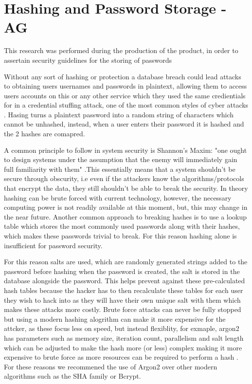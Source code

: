 \documentclass[11pt]{report}
\begin{document}
\section{Hashing and Password Storage - AG}

This research was performed during the production of the product, in order to assertain security guidelines for the storing of passwords \newline

Without any sort of hashing or protection a database breach could lead attacks to obtaining users usernames and passwords in plaintext, allowing them to access users accounts on this or any other service which they used the same credientials for in a credential stuffing attack, one of the most common styles of cyber attacks \cite{OWASP2020}. Hasing turns a plaintext password into a random string of characters which cannot be unhashed, instead, when a user enters their password it is hashed and the 2 hashes are comapred.

A common principle to follow in system security is Shannon's Maxim: "one ought to design systems under the assumption that the enemy will immediately gain full familiarity with them" \cite{Shannon1949}.This essentially means that a system shouldn’t be secure through obscurity, i.e even if the attackers know the algorithms/protocols that encrypt the data, they still shouldn’t be able to break the security. In theory hashing can be brute forced with current technology, however, the necessary computing power is not readily available at this moment, but, this may change in the near future. Another common approach to breaking hashes is to use a lookup table which stores the most commonly used passwords along with their hashes, which makes these passwords trivial to break. For this reason hashing alone is insufficient for password security. \cite{Tsudik1992}

For this reason salts are used, which are randomly generated strings added to the password before hashing when the password is created, the salt is stored in the database alongside the password. This helps prevent against these pre-calculated hash tables because the hacker has to then recalculate these tables for each user they wish to hack into as they will have their own unique salt with them which makes these attacks more costly. Brute force attacks can never be fully stopped but using a modern hashing alogrithm can make it more expensive for the attcker, as these focus less on speed, but instead flexiblity, for exmaple, argon2 has parameters such as memory size, iteration count, parallelism and salt length which can be adjusted to make the hash more (or less) complex making it more expensive to brute force as more resources can be required to perform a hash \cite{Biryukov2016}. For these reasons we recommened the use of Argon2 over other modern algorithms such as the SHA family or Bcrypt.
\end{document}
